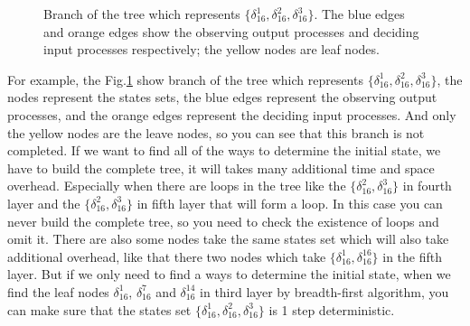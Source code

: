   \begin{figure}[thpb]
      \centering
      
      \caption{Branch of the tree which represents $\{\delta_{16}^1,\delta_{16}^2,\delta_{16}^3\}$. The blue edges and orange edges show the observing output processes and deciding input processes respectively; the yellow nodes are leaf nodes.}
      \label{fig:3}
   \end{figure}

For example, the Fig.\ref{fig:3} show branch of the tree which represents $\{\delta_{16}^1,\delta_{16}^2,\delta_{16}^3\}$, the nodes represent the states sets, the blue edges represent the observing output processes, and the orange edges represent the deciding input processes. And only the yellow nodes are the leave nodes, so you can see that this branch is not completed. If we want to find all of the ways to determine the initial state, we have to build the complete tree, it will takes many additional time and space overhead. Especially when there are loops in the tree like the $\{\delta_{16}^2,\delta_{16}^3\}$ in fourth layer and the $\{\delta_{16}^2,\delta_{16}^3\}$ in fifth layer that will form a loop. In this case you can never build the complete tree, so you need to check the existence of loops and omit it. There are also some nodes take the same states set which will also take additional overhead, like that there two nodes which take $\{\delta_{16}^1,\delta_{16}^{16}\}$ in the fifth layer. But if we only need to find a ways to determine the initial state, when we find the leaf nodes $\delta_{16}^1$, $\delta_{16}^7$ and  $\delta_{16}^{14}$ in third layer by breadth-first algorithm, you can make sure that the states set $\{\delta_{16}^1,\delta_{16}^2,\delta_{16}^3\}$ is 1 step deterministic.  
